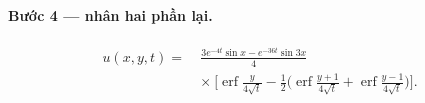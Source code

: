 \paragraph{Bước 4 --- nhân hai phần lại.}\leavevmode

\begin{nhobox}
\[
  \begin{aligned}
  u(x,y,t)=\ &\frac{3e^{-4t}\sin x-e^{-36t}\sin 3x}{4}\\[2pt]
  &\times\ \Big[\operatorname{erf}\tfrac{y}{4\sqrt t}-\tfrac12\big(\operatorname{erf}\tfrac{y+1}{4\sqrt t}+\operatorname{erf}\tfrac{y-1}{4\sqrt t}\big)\Big].
  \end{aligned}
\]
\end{nhobox}